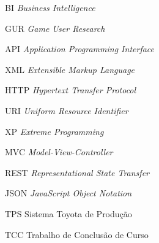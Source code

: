 \begin{siglas}
  \item[BI] \textit{Business Intelligence}
  \item[GUR] \textit{Game User Research}
  \item[API] \textit{Application Programming Interface}
  \item[XML] \textit{Extensible Markup Language}
  \item[HTTP] \textit{Hypertext Transfer Protocol}
  \item[URI] \textit{Uniform Resource Identifier}
  \item[XP] \textit{Extreme Programming}
  \item[MVC] \textit{Model-View-Controller}
  \item[REST] \textit{Representational State Transfer}
  \item[JSON] \textit{JavaScript Object Notation}
  \item[TPS] Sistema Toyota de Produção
  \item[TCC] Trabalho de Conclusão de Curso
\end{siglas}
